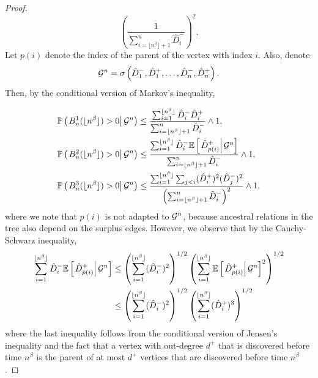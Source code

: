 \begin{proof}
$$\left(\frac{1}{\sum_{i=\lfloor n^\beta \rfloor+1}^n \hat{D}^-_i}\right)^2.$$
Let $p(i)$ denote the index of the parent of the vertex with index $i$. Also, denote $${\mathcal G}^n=\sigma\left(\hat{D}^-_1,\hat{D}^+_1,\dots,\hat{D}^-_n,\hat{D}^+_n \right).$$ Then, by the conditional version of Markov's inequality, 

\begin{align*}{\mathbb P}\left(\left.B^1_n(\lfloor n^\beta \rfloor)>0\right| {\mathcal G}^n \right)&\leq \frac{\sum_{i=1}^{\lfloor n^\beta \rfloor} \hat{D}^-_i\hat{D}^+_i}{\sum_{i=\lfloor n^\beta \rfloor+1}^n \hat{D}^-_i}\wedge 1,\\
{\mathbb P}\left(\left.B^2_n(\lfloor n^\beta \rfloor)>0\right| {\mathcal G}^n \right)&\leq \frac{\sum_{i=1}^{\lfloor n^\beta \rfloor} \hat{D}^-_i{\mathbb E}\left[\left.\hat{D}^+_{p(i)}\right|{\mathcal G}^n\right]}{\sum_{i=\lfloor n^\beta \rfloor+1}^n \hat{D}^-_i}\wedge 1,\\
{\mathbb P}\left(\left.B^3_n(\lfloor n^\beta \rfloor)>0\right| {\mathcal G}^n \right)&\leq \frac{\sum_{i=1}^{\lfloor n^\beta \rfloor}\sum_{j<i} (\hat{D}^+_i)^2 (\hat{D}^-_j)^2 }{\left(\sum_{i=\lfloor n^\beta \rfloor+1}^n \hat{D}^-_i\right)^2 }\wedge 1,\end{align*}
where we note that $p(i)$ is not adapted to ${\mathcal G}^n$, because ancestral relations in the tree also depend on the surplus edges. However, we observe that by the Cauchy-Schwarz inequality,
\begin{align*}\sum_{i=1}^{\lfloor n^\beta \rfloor} \hat{D}^-_i{\mathbb E}\left[\left.\hat{D}^+_{p(i)}\right|{\mathcal G}^n\right]&\leq \left(\sum_{i=1}^{\lfloor n^\beta \rfloor} (\hat{D}^-_i)^2\right)^{1/2}\left(\sum_{i=1}^{\lfloor n^\beta \rfloor} {\mathbb E}\left[\left.\hat{D}^+_{p(i)}\right|{\mathcal G}^n\right]^2\right)^{1/2}\\
&\leq\left(\sum_{i=1}^{\lfloor n^\beta \rfloor} (\hat{D}^-_i)^2\right)^{1/2}\left(\sum_{i=1}^{\lfloor n^\beta \rfloor} (\hat{D}^+_i)^3\right)^{1/2}\end{align*}
where the last inequality follows from the conditional version of Jensen's inequality and the fact that a vertex with out-degree $d^+$ that is discovered before time $n^\beta$ is the parent of at most $d^+$ vertices that are discovered before time $n^\beta$.


\end{proof}
